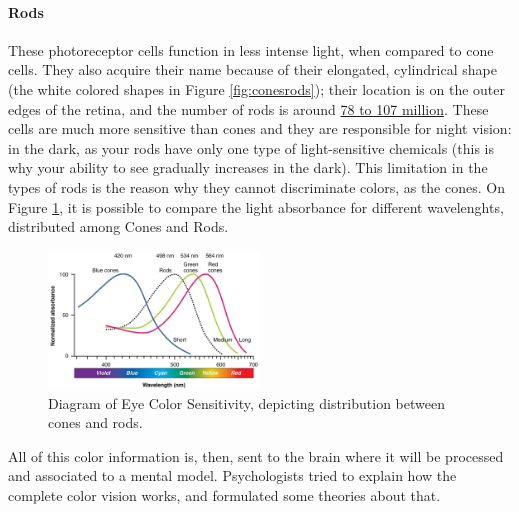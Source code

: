 \paragraph{Rods}
%
These photoreceptor cells function in less intense light, when compared to cone cells. They also acquire
their name because of their elongated, cylindrical shape (the white colored shapes in Figure \ref{fig:conesrods});
their location is on the outer edges of the retina, and the number of rods is around \ul{78 to 107 million}. These
cells are much more sensitive than
cones and they are responsible for night vision: in the dark, as your rods have only one type of light-sensitive chemicals (this is why your ability to see gradually increases in the dark). This limitation in the types of rods is the
reason why they cannot discriminate colors, as the cones. On Figure \ref{fig:colorsensitivity}, it is possible to compare
the light absorbance for different wavelenghts, distributed among Cones and Rods. \\ \par
%
\begin{figure}[H]
	\centering
    \vspace{-15pt}
    \includegraphics[width=0.5\textwidth]{images/background/Eye_Color_Sensitivity.jpg}
    \caption[Diagram of Eye Color Sensitivity]{Diagram of Eye Color Sensitivity, depicting distribution between cones and rods.\protect\footnotemark{}}
    \vspace{-15pt}
    \label{fig:colorsensitivity}
\end{figure}
%
All of this color information is, then, sent to the brain where it will be processed and associated to a
mental model. Psychologists tried to explain how the complete color vision works, and formulated some
theories about that.
%
